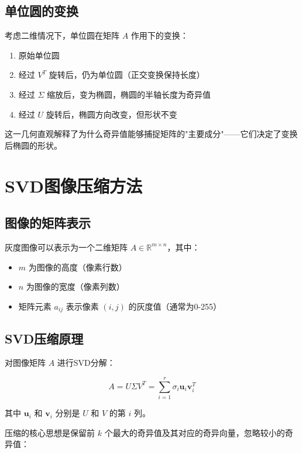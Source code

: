\documentclass[12pt,a4paper]{article}
\begin{document}
\subsection{单位圆的变换}

考虑二维情况下，单位圆在矩阵 $A$ 作用下的变换：

\begin{enumerate}
    \item 原始单位圆
    \item 经过 $V^T$ 旋转后，仍为单位圆（正交变换保持长度）
    \item 经过 $\Sigma$ 缩放后，变为椭圆，椭圆的半轴长度为奇异值
    \item 经过 $U$ 旋转后，椭圆方向改变，但形状不变
\end{enumerate}

这一几何直观解释了为什么奇异值能够捕捉矩阵的"主要成分"——它们决定了变换后椭圆的形状。

\section{SVD图像压缩方法}

\subsection{图像的矩阵表示}

灰度图像可以表示为一个二维矩阵 $A \in \mathbb{R}^{m \times n}$，其中：
\begin{itemize}
    \item $m$ 为图像的高度（像素行数）
    \item $n$ 为图像的宽度（像素列数）
    \item 矩阵元素 $a_{ij}$ 表示像素 $(i,j)$ 的灰度值（通常为0-255）
\end{itemize}

\subsection{SVD压缩原理}

对图像矩阵 $A$ 进行SVD分解：

\begin{equation}
    A = U\Sigma V^T = \sum_{i=1}^{r} \sigma_i \mathbf{u}_i \mathbf{v}_i^T
\end{equation}

其中 $\mathbf{u}_i$ 和 $\mathbf{v}_i$ 分别是 $U$ 和 $V$ 的第 $i$ 列。

压缩的核心思想是保留前 $k$ 个最大的奇异值及其对应的奇异向量，忽略较小的奇异值：
\end{document}
